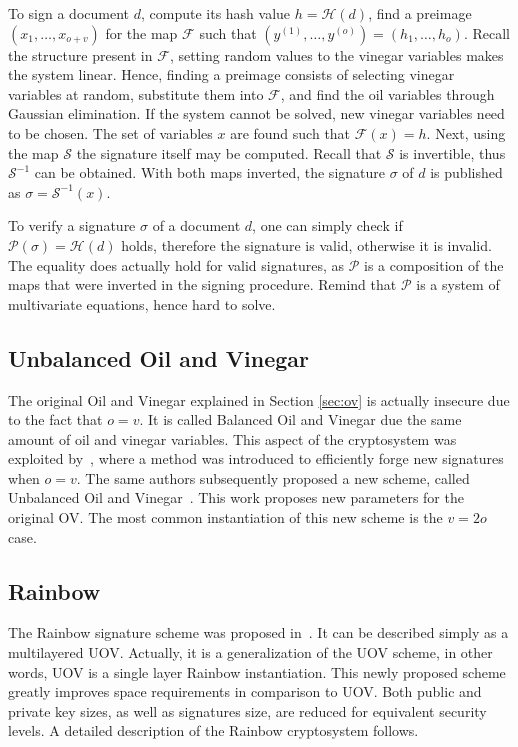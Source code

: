 \documentclass{ufsctex/ufsctex}
\begin{document}
To sign a document $d$, compute its hash value $h = \mathcal{H}(d)$, find a
preimage $(x_1,\dots,x_{o+v})$ for the map $\mathcal{F}$ such that
$(y^{(1)},\dots,y^{(o)}) = (h_1,\dots,h_o)$. Recall the structure present in
$\mathcal{F}$, setting random values to the vinegar variables makes the system
linear. Hence, finding a preimage consists of selecting vinegar variables at
random, substitute them into $\mathcal{F}$, and find the oil variables through
Gaussian elimination. If the system cannot be solved, new vinegar variables
need to be chosen. The set of variables $x$ are found such that
$\mathcal{F}(x)=h$. Next, using the map $\mathcal{S}$ the signature itself may
be computed. Recall that $\mathcal{S}$ is invertible, thus $\mathcal{S}^{-1}$
can be obtained. With both maps inverted, the signature $\sigma$ of $d$ is
published as $\sigma = \mathcal{S}^{-1}(x)$.

To verify a signature $\sigma$ of a document $d$, one can simply check if
$\mathcal{P}(\sigma) = \mathcal{H}(d)$ holds, therefore the signature is valid,
otherwise it is invalid. The equality does actually hold for valid signatures,
as $\mathcal{P}$ is a composition of the maps that were inverted in the signing
procedure. Remind that $\mathcal{P}$ is a system of multivariate equations,
hence hard to solve.

\subsection{Unbalanced Oil and Vinegar}

The original Oil and Vinegar explained in Section \ref{sec:ov} is actually
insecure due to the fact that $o = v$. It is called Balanced Oil and Vinegar
due the same amount of oil and vinegar variables. This aspect of the
cryptosystem was exploited by~\cite{kipnis1998cryptanalysis}, where a method
was introduced to efficiently forge new signatures when $o = v$. The same
authors subsequently proposed a new scheme, called Unbalanced Oil and
Vinegar~\cite{kipnis1999unbalanced}. This work proposes new parameters for the
original OV. The most common instantiation of this new scheme is the $v = 2o$
case.

\subsection{Rainbow}\label{sec:rainbow}

The Rainbow signature scheme was proposed in~\cite{ding2005rainbow}. It can be
described simply as a multilayered UOV. Actually, it is a generalization of the
UOV scheme, in other words, UOV is a single layer Rainbow instantiation. This
newly proposed scheme greatly improves space requirements in comparison to UOV.
Both public and private key sizes, as well as signatures size, are reduced for
equivalent security levels. A detailed description of the Rainbow cryptosystem
follows.
\end{document}
